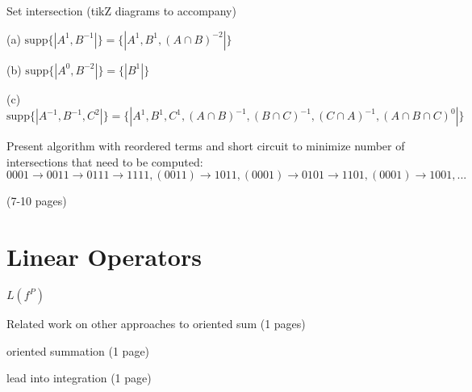 


\begin{example}
Set intersection (tikZ diagrams to accompany)

(a) $\mathrm{supp} \{\!| A^1, B^{-1} |\!\} = \{\!| A^1, B^1, (A \cap B)^{-2} |\!\}$

(b) $\mathrm{supp} \{\!| A^0, B^{-2} |\!\} = \{\!| B^1 |\!\}$

(c) $\mathrm{supp} \{\!| A^{-1}, B^{-1}, C^2 |\!\} = \{\!| A^1, B^1, C^1, (A \cap B)^{-1}, (B \cap C)^{-1}, (C \cap A)^{-1}, (A \cap B \cap C)^{0} |\!\}$
\end{example}

Present algorithm with reordered terms and short circuit to minimize number of intersections that need to be computed:
\begin{equation*}
0001 \to 0011 \to 0111 \to 1111, (0011) \to 1011, (0001) \to 0101 \to 1101, (0001) \to 1001, ...
\end{equation*}

(7-10 pages)

\newpage \addtocounter{page}{9}


\section{Linear Operators}

\begin{definition}
$L(f^P)$
\end{definition}

Related work on other approaches to oriented sum (1 pages)

\begin{example}{oriented summation} (1 page)
\end{example}

lead into integration (1 page)

\newpage \addtocounter{page}{2}
